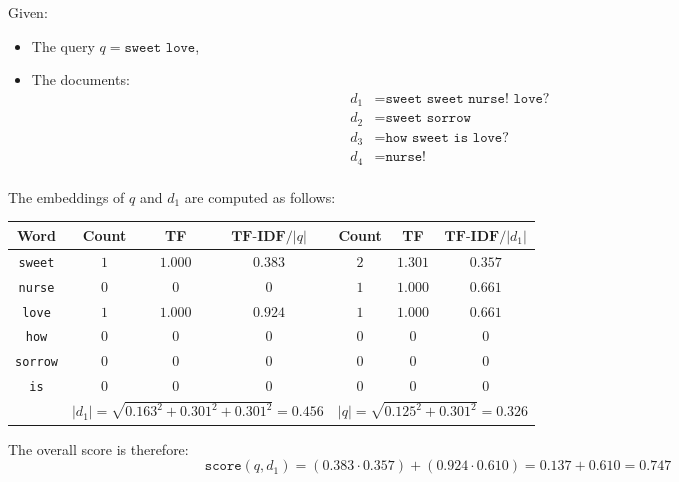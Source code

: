 \begin{description}
\begin{description}
                \begin{example}
                    Given:
                    \begin{itemize}
                        \item The query $q = \texttt{sweet love}$,
                        \item The documents:
                        \[
                            \begin{split}
                                d_1 &= \texttt{sweet sweet nurse! love?} \\
                                d_2 &= \texttt{sweet sorrow} \\
                                d_3 &= \texttt{how sweet is love?} \\
                                d_4 &= \texttt{nurse!} \\
                            \end{split}
                        \]
                    \end{itemize}
                    The embeddings of $q$ and $d_1$ are computed as follows:
                    \begin{table}[H]
                        \centering
                        \footnotesize
                        \begin{tabular}{c|ccc|ccc}
                            \toprule
                            \textbf{Word} & \textbf{Count} & \textbf{TF} & $\textbf{TF-IDF}/|q|$ & \textbf{Count} & \textbf{TF} & $\textbf{TF-IDF}/|d_1|$ \\
                            \midrule
                            \texttt{sweet}  & $1$ & $1.000$ & $0.383$ & $2$ & $1.301$ & $0.357$ \\
                            \texttt{nurse}  & $0$ & $0$ & $0$ & $1$ & $1.000$ & $0.661$ \\
                            \texttt{love}   & $1$ & $1.000$ & $0.924$ & $1$ & $1.000$ & $0.661$ \\
                            \texttt{how}    & $0$ & $0$ & $0$ & $0$ & $0$ & $0$ \\
                            \texttt{sorrow} & $0$ & $0$ & $0$ & $0$ & $0$ & $0$ \\
                            \texttt{is}     & $0$ & $0$ & $0$ & $0$ & $0$ & $0$ \\
                            \midrule
                            & \multicolumn{3}{l|}{$|d_1| = \sqrt{0.163^2 + 0.301^2 + 0.301^2} = 0.456$} & \multicolumn{3}{l}{$|q| = \sqrt{0.125^2 + 0.301^2} = 0.326$} \\
                            \bottomrule
                        \end{tabular}
                    \end{table}
                    The overall score is therefore:
                    \[ \texttt{score}(q, d_1) = (0.383 \cdot 0.357) + (0.924 \cdot 0.610) = 0.137 + 0.610 = 0.747 \]


\end{example}
\end{description}
\end{description}
